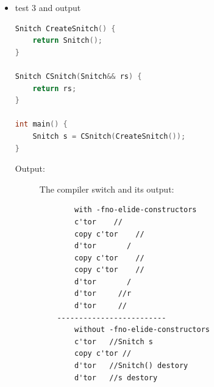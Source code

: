 \documentclass[a4paper,11pt,twoside]{book}
\begin{document}
\begin{itemize}
	\item test 3 and output
\begin{lstlisting}[frame=single, language=c++]
Snitch CreateSnitch() {
	return Snitch();
}
	
Snitch CSnitch(Snitch&& rs) {
	return rs;
}
	
int main() {
	Snitch s = CSnitch(CreateSnitch());
}
\end{lstlisting}
\begin{description}
	\item[Output:] The compiler switch and its output:
	\begin{verbatim}
		with -fno-elide-constructors
		c'tor    //
		copy c'tor    //
		d'tor       /
		copy c'tor    //
		copy c'tor    //
		d'tor       /
		d'tor     //r
		d'tor     //
	-------------------------
		without -fno-elide-constructors
		c'tor   //Snitch s
		copy c'tor //
		d'tor   //Snitch() destory
		d'tor   //s destory
	\end{verbatim}
\end{description}
\end{itemize}
\end{document}
